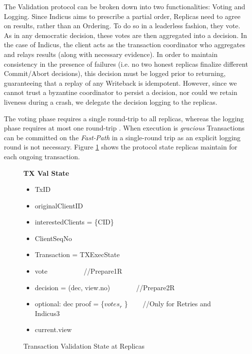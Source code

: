 The Validation protocol can be broken down into two functionalities: Voting and Logging.
Since Indicus aims to prescribe a partial order, Replicas need to agree on results, rather than an Ordering. To do so in a leaderless fashion, they vote. As in any democratic decision, these votes are then aggregated into a decision. In the case of Indicus, the client acts as the transaction coordinator who aggregates and relays results (along with necessary evidence).
 In order to maintain consistency in the presence of failures (i.e. no two honest replicas finalize different Commit/Abort decisions), this decision must be logged prior to returning, guaranteeing that a replay of any Writeback is idempotent.  However, since we cannot trust a byzantine coordinator to persist a decision, nor could we retain liveness during a crash, we delegate the decision logging to the replicas.
 

The voting phase requires a single round-trip to all replicas, whereas the logging phase requires at most one round-trip . When execution is \textit{gracious} Transactions can be committed on the \textit{Fast-Path} in a single-round trip as an explicit logging round is not necessary. Figure \ref{fig:Val} shows the protocol state replicas maintain for each ongoing transaction. 

\begin{figure}[t]
  \begin{mdframed}[roundcorner=10pt]
 	\textbf{TX Val State}
 	\begin{itemize}
 	\item TxID
 	\item originalClientID
 	\item interestedClients = \{CID\}
 	\item ClientSeqNo
 	\item Transaction = TXExecState
 	\item vote   ~~~~~~~~~~//Prepare1R
 	\item decision = (dec, view.no) ~~~~~~~//Prepare2R
 	\item optional: dec proof = \{$votes_r$ \} ~~~ //Only for Retries and Indicus3
 	\item current.view
 	\end{itemize}
  \end{mdframed}
  \caption{Transaction Validation State at Replicas}
  \label{fig:Val}
\end{figure}

